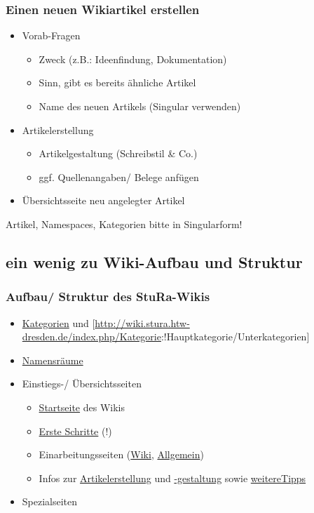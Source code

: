 \documentclass[handout]{beamer}   %
\begin{document}
\begin{frame}
  \frametitle{Einen neuen Wikiartikel erstellen}
  \begin{itemize}[<+->]
    \item Vorab-Fragen
    \begin{itemize}
      \item Zweck (z.B.: Ideenfindung, Dokumentation)
      \item Sinn, gibt es bereits ähnliche Artikel
      \item Name des neuen Artikels (Singular verwenden)
    \end{itemize}
    \item Artikelerstellung
    \begin{itemize}
      \item Artikelgestaltung (Schreibstil \& Co.)
      \item ggf. Quellenangaben/ Belege anfügen
    \end{itemize}
    \item Übersichtsseite neu angelegter Artikel
  \end{itemize}
  Artikel, Namespaces, Kategorien bitte in Singularform!
\end{frame}

\subsection{ein wenig zu Wiki-Aufbau und Struktur}

\begin{frame}
  \frametitle{Aufbau/ Struktur des StuRa-Wikis}
  \begin{itemize}[<+->]
    \item \href{http://wiki.stura.htw-dresden.de/index.php/Spezial:Kategorien}{Kategorien} und [\url{http://wiki.stura.htw-dresden.de/index.php/Kategorie}:!Hauptkategorie/Unterkategorien]
    \item \href{http://wiki.stura.htw-dresden.de/index.php/Admin:Namensr\%C3\%A4ume}{Namensräume}
    \item Einstiegs-/ Übersichtsseiten
    \begin{itemize}
      \item \href{http://wiki.stura.htw-dresden.de/index.php/Hauptseite}{Startseite} des Wikis
      \item \href{http://wiki.stura.htw-dresden.de/index.php/StuRa_HTW_Dresden:Erste_Schritte}{Erste Schritte} (!)
      \item Einarbeitungsseiten (\href{http://wiki.stura.htw-dresden.de/index.php/Wiki/Einarbeitung}{Wiki}, \href{http://wiki.stura.htw-dresden.de/index.php/Einarbeitung}{Allgemein})
      \item Infos zur \href{http://wiki.stura.htw-dresden.de/index.php/Artikelerstellung}{Artikelerstellung} und \href{http://wiki.stura.htw-dresden.de/index.php/Admin:Artikelgestaltung}{-gestaltung} sowie \href{https://de.wikipedia.org/wiki/Wikipedia:Wie_schreibe_ich_gute_Artikel}{weitereTipps}
    \end{itemize}
    \item Spezialseiten
  \end{itemize}
\end{frame}
\end{document}
